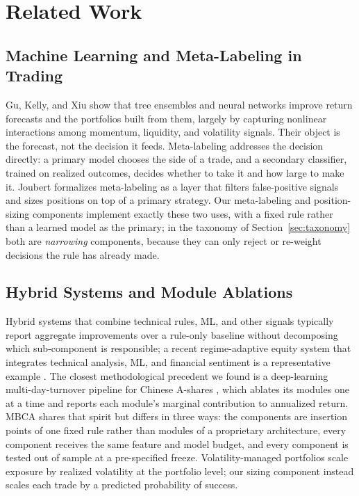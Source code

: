 \section{Related Work}
\label{sec:related}

\subsection{Machine Learning and Meta-Labeling in Trading}

Gu, Kelly, and Xiu \cite{gu2020empirical} show that tree ensembles and neural networks improve return forecasts and
the portfolios built from them, largely by capturing nonlinear interactions among momentum, liquidity, and volatility
signals. Their object is the forecast, not the decision it feeds. Meta-labeling \cite{lopezdeprado2018afml} addresses
the decision directly: a primary model chooses the side of a trade, and a secondary classifier, trained on realized
outcomes, decides whether to take it and how large to make it. Joubert \cite{joubert2022metalabeling} formalizes
meta-labeling as a layer that filters false-positive signals and sizes positions on top of a primary strategy. Our
meta-labeling and position-sizing components implement exactly these two uses, with a fixed rule rather than a learned
model as the primary; in the taxonomy of Section~\ref{sec:taxonomy} both are \emph{narrowing} components, because
they can only reject or re-weight decisions the rule has already made.

\subsection{Hybrid Systems and Module Ablations}

Hybrid systems that combine technical rules, ML, and other signals typically report aggregate improvements over a
rule-only baseline without decomposing which sub-component is responsible; a recent regime-adaptive equity system that
integrates technical analysis, ML, and financial sentiment is a representative example
\cite{generatingalpha2026hybrid}. The closest methodological precedent we found is a deep-learning multi-day-turnover
pipeline for Chinese A-shares \cite{turnover2025ablation}, which ablates its modules one at a time and reports each
module's marginal contribution to annualized return. MBCA shares that spirit but differs in three ways: the
components are insertion points of one fixed rule rather than modules of a proprietary architecture, every component
receives the same feature and model budget, and every component is tested out of sample at a pre-specified freeze.
Volatility-managed portfolios \cite{moreira2017volmanaged} scale exposure by realized volatility at the portfolio
level; our sizing component instead scales each trade by a predicted probability of success.

